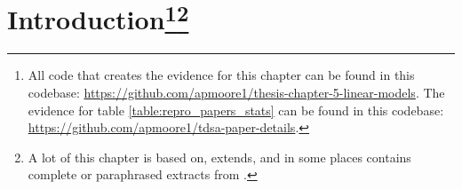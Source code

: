 %
%
%
%

\section[Introduction]{Introduction\footnote{All code that creates the evidence for this chapter can be found in this codebase: \url{https://github.com/apmoore1/thesis-chapter-5-linear-models}. The evidence for table \ref{table:repro_papers_stats} can be found in this codebase: \url{https://github.com/apmoore1/tdsa-paper-details}.}\footnote{A lot of this chapter is based on, extends, and in some places contains complete or paraphrased extracts from \citet{moore-rayson-2018-bringing}.}}
\label{section:repro_intro}

